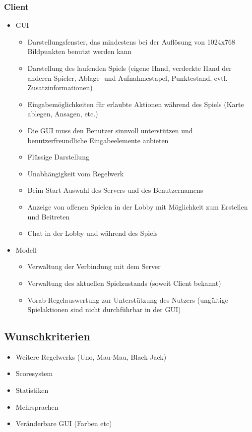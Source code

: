 \documentclass{article}
\begin{document}
\subsubsection{\gls{Client}}
\begin{itemize}
	\item GUI
	\begin{itemize}
		\item Darstellungsfenster, das mindestens bei der Auflösung von 1024x768 Bildpunkten benutzt werden kann
		\item Darstellung des laufenden Spiels (eigene Hand, verdeckte Hand der anderen Spieler, Ablage- und Aufnahmestapel, 			Punktestand, evtl. Zusatzinformationen)
		\item Eingabemöglichkeiten für erlaubte Aktionen während des Spiels (Karte ablegen, Ansagen, etc.)
		\item Die GUI muss den Benutzer sinnvoll unterstützen und benutzerfreundliche Eingabeelemente anbieten
		\item Flüssige Darstellung
		\item Unabhängigkeit vom \gls{Regelwerk}
		\item Beim Start Auswahl des \gls{Server}s und des Benutzernamens
		\item Anzeige von offenen Spielen in der \gls{Lobby} mit Möglichkeit zum Erstellen und Beitreten
		\item Chat in der \gls{Lobby} und während des Spiels
	\end{itemize}
	\item Modell
	\begin{itemize}
		\item Verwaltung der Verbindung mit dem \gls{Server}
		\item Verwaltung des aktuellen Spielzustands (soweit \gls{Client} bekannt)
		\item Vorab-Regelauswertung zur Unterstützung des Nutzers (ungültige Spielaktionen sind nicht durchführbar in der 					GUI)
	\end{itemize}
\end{itemize}

\subsection{Wunschkriterien}
\begin{itemize}
	\item Weitere \glspl{Regelwerk} (Uno, Mau-Mau, Black Jack)
	\item Scoresystem
	\item Statistiken
	\item Mehrsprachen
	\item Veränderbare GUI (Farben etc)
\end{itemize}
\end{document}
